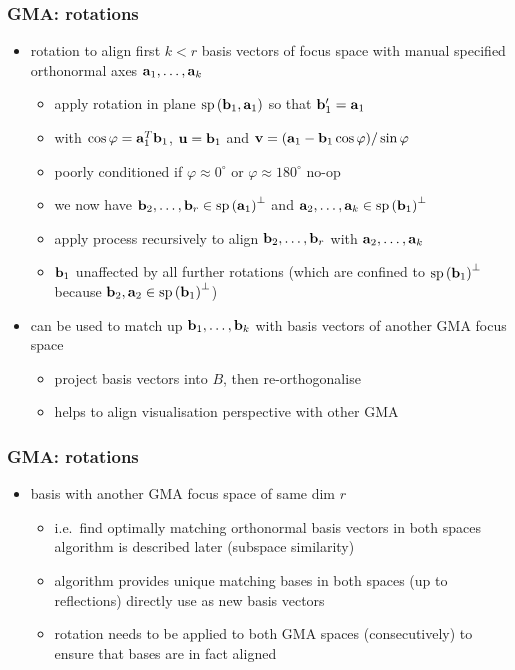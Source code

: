 \documentclass[t]{beamer} %
\begin{document}
\begin{frame}
  \frametitle{GMA: rotations}

  \begin{itemize}
  \item {} rotation to align first $k < r$ basis vectors of focus space with manual specified orthonormal axes $\va_1, \ldots, \va_k$
    \begin{itemize}
    \item[\hand] apply rotation in plane $\Span{\vb_1, \va_1}$ so that $\vb'_1 = \va_1$
    \item[\hand] with $\cos \varphi = \va_1^T \vb_1$, $\vu = \vb_1$ and $\vv = (\va_1 - \vb_1 \cos \varphi) / \sin \varphi$
    \item[\hand] poorly conditioned if $\varphi \approx 0^{\circ}$ or $\varphi \approx 180^{\circ}$ \so no-op
    \item[\hand] we now have $\vb_2, \ldots, \vb_r \in \Span{\va_1}^{\perp}$ and $\va_2, \ldots, \va_k \in \Span{\vb_1}^{\perp}$
    \item[\hand] apply process recursively to align $\vb_2, \ldots, \vb_r$ with $\va_2, \ldots, \va_k$
    \item[\hand] $\vb_1$ unaffected by all further rotations (which are confined to $\Span{\vb_1}^{\perp}$ because $\vb_2, \va_2 \in \Span{\vb_1}^{\perp}$)
    \end{itemize}
  \item can be used to match up $\vb_1, \ldots, \vb_k$ with basis vectors of another GMA focus space
    \begin{itemize}
    \item[\hand] project basis vectors into $B$, then re-orthogonalise
    \item[\hand] helps to align visualisation perspective with other GMA
    \end{itemize}
  \end{itemize}
\end{frame}

\begin{frame}
  \frametitle{GMA: rotations}

  \begin{itemize}
  \item {} basis with another GMA focus space of same dim $r$
    \begin{itemize}
    \item[\hand] i.e.\ find optimally matching orthonormal basis vectors in both spaces \so algorithm is described later (subspace similarity)
    \item[\hand] algorithm provides unique matching bases in both spaces (up to reflections) \so directly use as new basis vectors
    \item[\hand] rotation needs to be applied to both GMA spaces (consecutively) to ensure that bases are in fact aligned
    \end{itemize}
  \end{itemize}
\end{frame}
\end{document}

